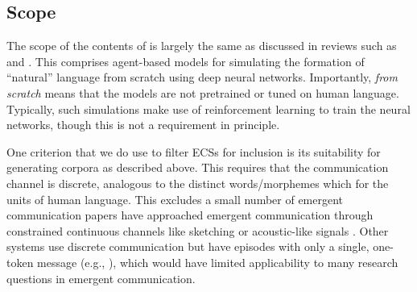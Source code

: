 \subsection{Scope}
The scope of the contents of \theLib{} is largely the same as discussed in reviews such as \citet{lazaridou2020review} and \citet[Section 1.2]{boldt2024review}.
This comprises agent-based models for simulating the formation of ``natural'' language from scratch using deep neural networks.
Importantly, \emph{from scratch} means that the models are not pretrained or tuned on human language.
Typically, such simulations make use of reinforcement learning to train the neural networks, though this is not a requirement in principle.

One criterion that we do use to filter ECSs for inclusion is its suitability for generating corpora as described above.
This requires that the communication channel is discrete, analogous to the distinct words/morphemes which for the units of human language.
This excludes a small number of emergent communication papers have approached emergent communication through constrained continuous channels like sketching \citep{mihai2021learning} or acoustic-like signals \citep{eloff2023learning}.
Other systems use discrete communication but have episodes with only a single, one-token message (e.g., \citet{tucker2021discrete}), which would have limited applicability to many research questions in emergent communication.


